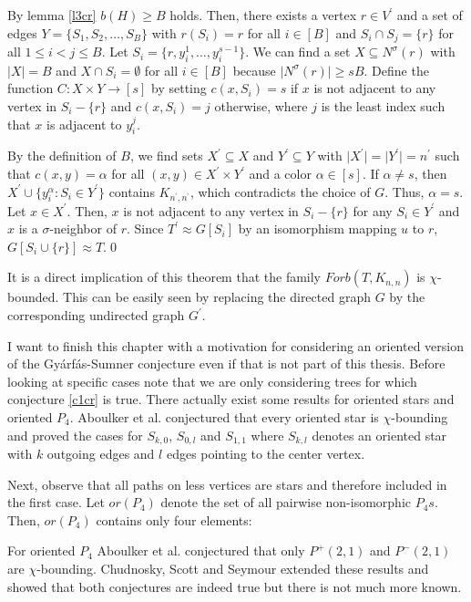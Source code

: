 \begin{prf}
By lemma \ref{l3cr} $b(H)\geq B$ holds. Then, there exists a vertex $r\in V^\prime$ and a set of edges $Y = \{S_1,S_2,\dots ,S_B\}$ with $r(S_i)=r$ for all $i\in [B]$ and $S_i\cap S_j=\{r\}$ for all $1\leq i<j\leq B$. Let $S_i=\{r,y_i^1,\dots ,y_i^{s-1}\}$. We can find a set $X\subseteq N^\sigma (r)$ with $\vert X\vert =B$ and $X\cap S_i =\emptyset$ for all $i\in [B]$ because $\vert N^\sigma (r)\vert\geq sB$. Define the function $C:X\times Y\to [s]$ by setting $c(x,S_i)=s$ if $x$ is not adjacent to any vertex in $S_i-\{r\}$ and $c(x,S_i)=j$ otherwise, where $j$ is the least index such that $x$ is adjacent to $y_i^j$.

By the definition of $B$, we find sets $X^\prime\subseteq X$ and $Y^\prime\subseteq Y$ with $\vert X^\prime\vert = \vert Y^\prime\vert =n^\prime$ such that $c(x,y)=\alpha$ for all $(x,y)\in X^\prime\times Y^\prime$ and a color $\alpha\in [s]$. If $\alpha\neq s$, then $X^\prime\cup\{y_i^\alpha :S_i\in Y^\prime\}$ contains $K_{n^\prime ,n^\prime}$, which contradicts the choice of $G$. Thus, $\alpha = s$. Let $x\in X^\prime$. Then, $x$ is not adjacent to any vertex in $S_i - \{r\}$ for any $S_i\in Y^\prime$ and $x$ is a $\sigma$-neighbor of $r$. Since $T^\prime\approx G[S_i]$ by an isomorphism mapping $u$ to $r$, $G[S_i\cup\{r\}]\approx T$.\qed
\end{prf}

\begin{note}
It is a direct implication of this theorem that the family $\textit{Forb}(T,K_{n,n})$ is $\chi$-bounded. This can be easily seen by replacing the directed graph $G$ by the corresponding undirected graph $G^\prime$.
\end{note}

I want to finish this chapter with a motivation for considering an oriented version of the Gyárfás-Sumner conjecture even if that is not part of this thesis. Before looking at specific cases note that we are only considering trees for which conjecture \ref{c1cr} is true. There actually exist some results for oriented stars and oriented $P_4$. Aboulker et al. \cite{Ab16} conjectured that every oriented star is $\chi$-bounding and proved the cases for $S_{k,0}$, $S_{0,l}$ and $S_{1,1}$ where $S_{k,l}$ denotes an oriented star with $k$ outgoing edges and $l$ edges pointing to the center vertex. 

Next, observe that all paths on less vertices are stars and therefore included in the first case. Let $or(P_4)$ denote the set of all pairwise non-isomorphic $P_4s$. Then, $or(P_4)$ contains only four elements:

For oriented $P_4$ Aboulker et al. \cite{Ab16} conjectured that only $P^+(2,1)$ and $P^-(2,1)$ are $\chi$-bounding. Chudnosky, Scott and Seymour \cite{CSS17b} extended these results and showed that both conjectures are indeed true but there is not much more known. 
